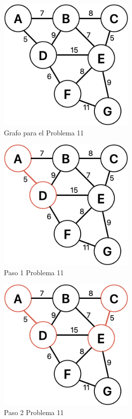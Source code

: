 \documentclass[12pt]{article}  %
\begin{document}
\begin{figure}[H]
\centering
\caption{Grafo para el Problema 11}
\label{fig:GrafoProb11}
\includegraphics[width=0.6\textwidth]{GrafoProb11.png}
\end{figure}

\begin{figure}[H]
\centering
\caption{Paso 1 Problema 11}
\label{fig:paso1Prob11}
\includegraphics[width=0.6\textwidth]{paso1Prob11.png}
\end{figure}

\begin{figure}[H]
\centering
\caption{Paso 2 Problema 11}
\label{fig:paso2Prob11}
\includegraphics[width=0.6\textwidth]{paso2Prob11.png}
\end{figure}
\end{document}
